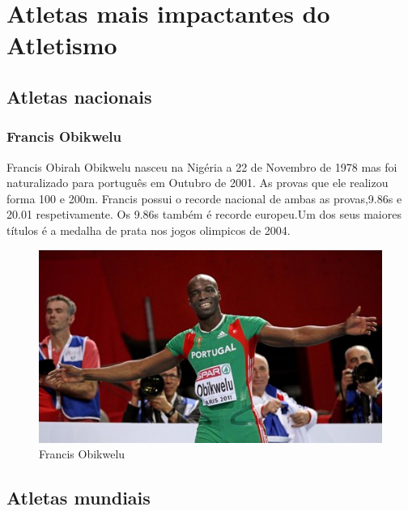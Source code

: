 \documentclass{report}
\begin{document}
    \section{Atletas mais impactantes do Atletismo}
     \subsection{Atletas nacionais}
        \subsubsection{Francis Obikwelu}
        Francis Obirah Obikwelu nasceu na Nigéria a 22 de Novembro de 1978 mas foi naturalizado para português em Outubro de 2001. As provas que ele realizou forma 100 e 200m. Francis possui o recorde nacional de ambas as provas,9.86s e 20.01 respetivamente. Os 9.86s também é recorde europeu.Um dos seus maiores títulos é a medalha de prata nos jogos olimpicos de 2004. \cite{francis}
        \FloatBarrier
            \begin{figure}[h]
            \center
            \includegraphics[scale=.35,angle=0]{francis.jpg}
            \caption{Francis Obikwelu}
            \label{fig:francis.2}
            \end{figure}
        \FloatBarrier
        
     \subsection{Atletas mundiais}
\end{document}
